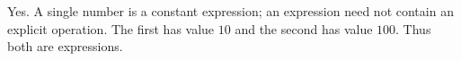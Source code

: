 Yes. A single number is a constant expression; an expression need not contain an explicit operation. The first has value $10$ and the second has value $100$. Thus both are expressions.
